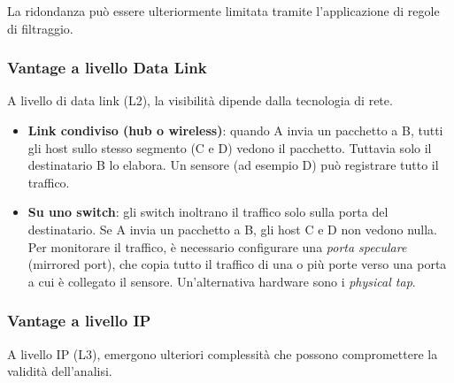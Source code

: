 La ridondanza può essere ulteriormente limitata tramite l'applicazione
di regole di filtraggio.

\subsubsection{Vantage a livello Data Link}

A livello di data link (L2), la visibilità dipende dalla tecnologia di rete.

\begin{itemize}
\item \textbf{Link condiviso (hub o wireless)}: quando A invia un pacchetto
a B, tutti gli host sullo stesso segmento (C e D) vedono il pacchetto.
Tuttavia solo il destinatario B lo elabora. Un sensore (ad esempio D)
può registrare tutto il traffico.
\item \textbf{Su uno switch}: gli switch inoltrano il traffico solo sulla
porta del destinatario. Se A invia un pacchetto a B, gli host C e D
non vedono nulla. Per monitorare il traffico, è necessario configurare
una \textit{porta speculare} (mirrored port), che copia tutto il traffico
di una o più porte verso una porta a cui è collegato il sensore.
Un'alternativa hardware sono i \textit{physical tap}.
\end{itemize}

\subsubsection{Vantage a livello IP}

A livello IP (L3), emergono ulteriori complessità che possono compromettere
la validità dell'analisi.


